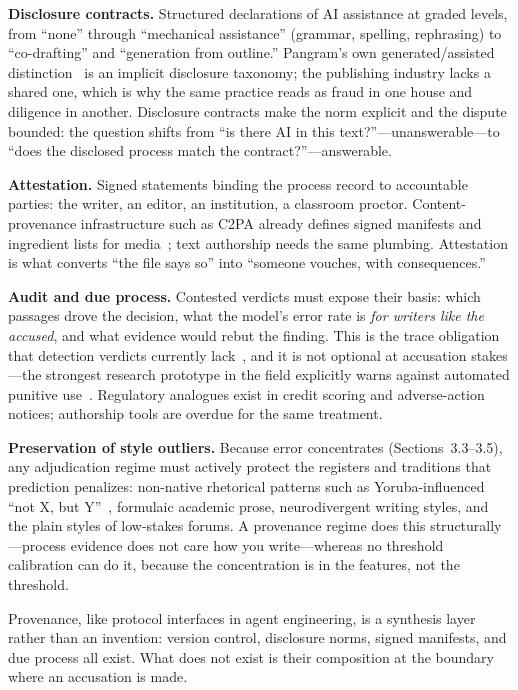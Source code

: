 \documentclass[sigconf,nonacm]{acmart}
\begin{document}
\noindent\textbf{Disclosure contracts.} Structured declarations of AI assistance at graded levels, from ``none'' through ``mechanical assistance'' (grammar, spelling, rephrasing) to ``co-drafting'' and ``generation from outline.'' Pangram's own generated/assisted distinction~\cite{r1} is an implicit disclosure taxonomy; the publishing industry lacks a shared one, which is why the same practice reads as fraud in one house and diligence in another. Disclosure contracts make the norm explicit and the dispute bounded: the question shifts from ``is there AI in this text?''---unanswerable---to ``does the disclosed process match the contract?''---answerable.

\noindent\textbf{Attestation.} Signed statements binding the process record to accountable parties: the writer, an editor, an institution, a classroom proctor. Content-provenance infrastructure such as C2PA already defines signed manifests and ingredient lists for media~\cite{r10}; text authorship needs the same plumbing. Attestation is what converts ``the file says so'' into ``someone vouches, with consequences.''

\noindent\textbf{Audit and due process.} Contested verdicts must expose their basis: which passages drove the decision, what the model's error rate is \emph{for writers like the accused}, and what evidence would rebut the finding. This is the trace obligation that detection verdicts currently lack~\cite{r4}, and it is not optional at accusation stakes---the strongest research prototype in the field explicitly warns against automated punitive use~\cite{r14}. Regulatory analogues exist in credit scoring and adverse-action notices; authorship tools are overdue for the same treatment.

\noindent\textbf{Preservation of style outliers.} Because error concentrates (Sections~3.3--3.5), any adjudication regime must actively protect the registers and traditions that prediction penalizes: non-native rhetorical patterns such as Yoruba-influenced ``not X, but Y''~\cite{r1,r3}, formulaic academic prose, neurodivergent writing styles, and the plain styles of low-stakes forums. A provenance regime does this structurally---process evidence does not care how you write---whereas no threshold calibration can do it, because the concentration is in the features, not the threshold.

Provenance, like protocol interfaces in agent engineering, is a synthesis layer rather than an invention: version control, disclosure norms, signed manifests, and due process all exist. What does not exist is their composition at the boundary where an accusation is made.
\end{document}

